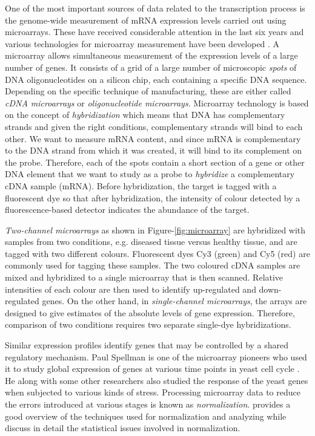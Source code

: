 One of the most important sources of data related to the transcription process is the genome-wide measurement of \ac{mRNA} expression levels carried out using microarrays. These have received considerable attention in the last six years and various technologies for microarray measurement have been developed \citep{Schulze01navigating}. A microarray allows simultaneous measurement of the expression levels of a large number of genes. It consists of a grid of a large number of microscopic \textit{spots} of DNA oligonucleotides on a silicon chip, each containing a specific DNA sequence. Depending on the specific technique of manufacturing, these are either called \textit{cDNA microarrays} or \textit{oligonucleotide microarrays}. Microarray technology is based on the concept of \textit{hybridization} which means that DNA has complementary strands and given the right conditions, complementary strands will bind to each other. We want to measure \ac{mRNA} content, and since \ac{mRNA} is complementary to the DNA strand from which it was created, it will bind to its complement on the probe. Therefore, each of the spots contain a short section of a gene or other DNA element that we want to study as a probe to \textit{hybridize} a complementary cDNA sample (\ac{mRNA}). Before hybridization, the target is tagged with a fluorescent dye so that after hybridization, the intensity of colour detected by a fluorescence-based detector indicates the abundance of the target.

\textit{Two-channel microarrays} as shown in Figure-\ref{fig:microarray} are hybridized with samples from two conditions, e.g. diseased tissue versus healthy tissue, and are tagged with two different colours. Fluorescent dyes Cy3 (green) and Cy5 (red) are commonly used for tagging these samples. The two coloured cDNA samples are mixed and hybridized to a single microarray that is then scanned. Relative intensities of each colour are then used to identify up-regulated and down-regulated genes. On the other hand, in \textit{single-channel microarrays}, the arrays are designed to give estimates of the absolute levels of gene expression. Therefore, comparison of two conditions requires two separate single-dye hybridizations. 

Similar expression profiles identify genes that may be controlled by a shared regulatory mechanism. Paul Spellman is one of the microarray pioneers who used it to study global expression of genes at various time points in yeast cell cycle \citep{spellman98comprehensive}. He along with some other researchers \citep{gasch00genomicexpn} also studied the response of the yeast genes when subjected to various kinds of stress. Processing microarray data to reduce the errors introduced at various stages is known as \textit{normalization}. \citet{Quackenbush06computational} provides a good overview of the techniques used for normalization and analyzing while \citet{Smythe03Statistical} discuss in detail the statistical issues involved in normalization. 

